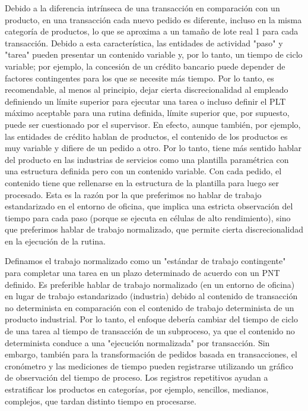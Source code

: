 Debido a la diferencia intrínseca de una transacción en comparación con un producto, en una transacción cada nuevo pedido es diferente, incluso en la misma categoría de productos, lo que se aproxima a un tamaño de lote real 1 para cada transacción.
Debido a esta característica, las entidades de actividad "paso" y "tarea" pueden presentar un contenido variable y, por lo tanto, un tiempo de ciclo variable; por ejemplo, la concesión de un crédito bancario puede depender de factores contingentes para los que se necesite más tiempo.
Por lo tanto, es recomendable, al menos al principio, dejar cierta discrecionalidad al empleado definiendo un límite superior para ejecutar una tarea o incluso definir el PLT máximo aceptable para una rutina definida, límite superior que, por supuesto, puede ser cuestionado por el supervisor.
En efecto, aunque también, por ejemplo, las entidades de crédito hablan de productos, el contenido de los productos es muy variable y difiere de un pedido a otro.
Por lo tanto, tiene más sentido hablar del producto en las industrias de servicios como una plantilla paramétrica con una estructura definida pero con un contenido variable.
Con cada pedido, el contenido tiene que rellenarse en la estructura de la plantilla para luego ser procesado. 
Esta es la razón por la que preferimos no hablar de trabajo estandarizado en el entorno de oficina, que implica una estricta observación del tiempo para cada paso (porque se ejecuta en células de alto rendimiento), sino que preferimos hablar de trabajo normalizado, que permite cierta discrecionalidad en la ejecución de la rutina.

Definamos el trabajo normalizado como un "estándar de trabajo contingente" para completar una tarea en un plazo determinado de acuerdo con un PNT definido.
Es preferible hablar de trabajo normalizado (en un entorno de oficina) en lugar de trabajo estandarizado (industria) debido al contenido de transacción no determinista en comparación con el contenido de trabajo determinista de un producto industrial.
Por lo tanto, el enfoque debería cambiar del tiempo de ciclo de una tarea al tiempo de transacción de un subproceso, ya que el contenido no determinista conduce a una "ejecución normalizada" por transacción.
Sin embargo, también para la transformación de pedidos basada en transacciones, el cronómetro y las mediciones de tiempo pueden registrarse utilizando un gráfico de observación del tiempo de proceso. Los registros repetitivos ayudan a estratificar los productos en categorías, por ejemplo, sencillos, medianos, complejos, que tardan distinto tiempo en procesarse.

